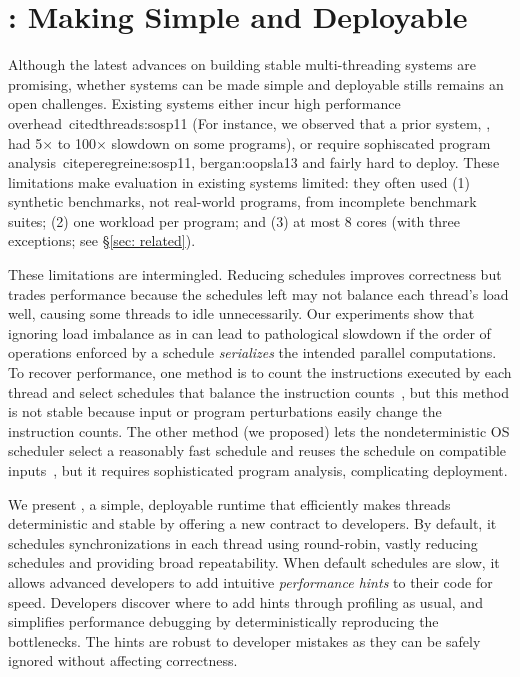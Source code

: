 \chapter{\parrot: Making \smt Simple and Deployable} \label{sec:parrot}

Although the latest advances on building stable
multi-threading systems are promising, whether \smt systems can be 
made simple and deployable stills remains an open challenges. Existing systems 
either incur high performance overhead~cite{dthreads:sosp11} (For instance, 
we observed that a prior system, \dthreads, had 5$\times$ to 100$\times$ slowdown on
some programs), or require sophiscated program analysis~cite{peregreine:sosp11, bergan:oopsla13}
and fairly hard to deploy.
These limitations make evaluation in existing systems limited: they often 
used (1) synthetic benchmarks,
not real-world programs, from incomplete benchmark suites; (2) one workload
per program; and (3) at most 8 cores (with three exceptions; see \S\ref{sec:
related}).

These limitations are intermingled.  Reducing schedules improves correctness
but trades performance because the schedules left may not balance each
thread's load well, causing some threads to idle unnecessarily.  Our
experiments show that ignoring load imbalance as in \dthreads
can lead to pathological
slowdown if the order of operations enforced by a schedule
\emph{serializes} the intended parallel computations.
To recover performance, one method is to count
the instructions executed by each thread and select schedules that balance
the instruction counts~\cite{kendo:asplos09, coredet:asplos10,
  dmp:asplos09}, but this method is not stable because input or program
perturbations easily change the instruction counts.  The other method (we 
proposed)
lets the nondeterministic OS scheduler select
a reasonably fast schedule and reuses the schedule on
compatible inputs~\cite{cui:tern:osdi10,peregrine:sosp11}, but it
requires sophisticated program analysis, complicating deployment.

We present \parrot, a simple, deployable runtime that efficiently makes
threads deterministic and stable by offering a new contract to developers.
By default, it schedules synchronizations in each thread using
round-robin, vastly reducing schedules and providing broad repeatability.
When default schedules are slow, it allows advanced developers to add
intuitive \emph{performance hints} to their code for speed.  Developers 
discover
where to add hints through profiling as usual, and \parrot simplifies
performance debugging by deterministically reproducing the bottlenecks.
The hints are robust to developer mistakes as they can be safely ignored
without affecting correctness.

